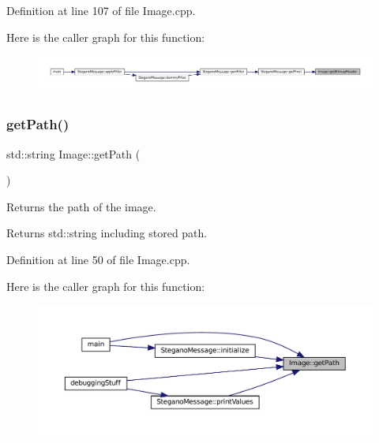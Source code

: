 Definition at line 107 of file Image.\+cpp.

Here is the caller graph for this function\+:\nopagebreak
\begin{figure}[H]
\begin{center}
\leavevmode
\includegraphics[width=350pt]{classImage_a8c824ffac0c866a94752a2c1047932af_icgraph}
\end{center}
\end{figure}
\mbox{\label{classImage_a885989eb723cb0a1fc0555c7e8de817e}} 
\subsubsection{\texorpdfstring{getPath()}{getPath()}}
{\footnotesize\ttfamily std\+::string Image\+::get\+Path (\begin{DoxyParamCaption}{ }\end{DoxyParamCaption})}



Returns the path of the image. 

\begin{DoxyReturn}{Returns}
std\+::string including stored path. 
\end{DoxyReturn}


Definition at line 50 of file Image.\+cpp.

Here is the caller graph for this function\+:\nopagebreak
\begin{figure}[H]
\begin{center}
\leavevmode
\includegraphics[width=350pt]{classImage_a885989eb723cb0a1fc0555c7e8de817e_icgraph}
\end{center}
\end{figure}
\mbox{\label{classImage_ac4e8db14cfd60a6a7085e6fcb83488a4}} 
